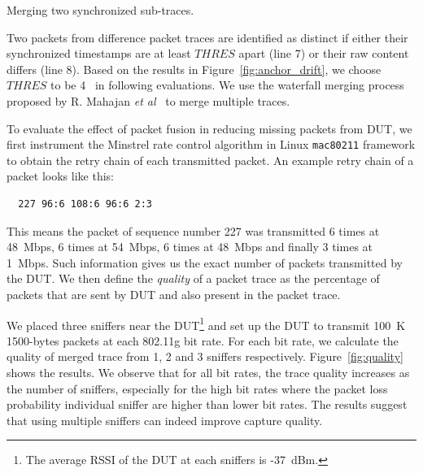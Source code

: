 \begin{algorithm}[t!]
  \caption{Merging two synchronized sub-traces.}
  \label{algo:merge}
  \begin{algorithmic}[1]
    \Statex
          \State {}
        \EndIf
      \EndFor
    \EndFunction
  \end{algorithmic}
\end{algorithm}

Two packets from difference packet traces are identified as distinct if either
their synchronized timestamps are at least $THRES$ apart (line 7) or their raw
content differs (line 8).  Based on the results in
Figure~\ref{fig:anchor_drift}, we choose $THRES$ to be 4~\us{} in following
evaluations. We use the waterfall merging process proposed by R. Mahajan
\textit{et al}~\cite{Mahajan:2006:AMB:1159913.1159923} to merge multiple traces.

To evaluate the effect of packet fusion in reducing missing packets from DUT, we
first instrument the Minstrel rate control algorithm in Linux \texttt{mac80211}
framework to obtain the retry chain of each transmitted packet. An example retry
chain of a packet looks like this:

\begin{verbatim}
  227 96:6 108:6 96:6 2:3
\end{verbatim}

This means the packet of sequence number 227 was transmitted 6 times at 48~Mbps,
6 times at 54~Mbps, 6 times at 48~Mbps and finally 3 times at 1~Mbps. Such
information gives us the exact number of packets transmitted by the DUT. We
then define the \textit{quality} of a packet trace as the percentage of packets
that are sent by DUT and also present in the packet trace.

We placed three sniffers near the DUT\footnote{The average RSSI of the DUT at
each sniffers is -37~dBm.} and set up the DUT to transmit 100~K
1500-bytes packets at each 802.11g bit rate. For each bit rate, we calculate the
quality of merged trace from 1, 2 and 3 sniffers respectively.
Figure~\ref{fig:quality} shows the results. We observe that for all bit rates,
the trace quality increases as the number of sniffers, especially for the high
bit rates where the packet loss probability individual sniffer are higher than
lower bit rates. The results suggest that using multiple sniffers can indeed
improve capture quality.

